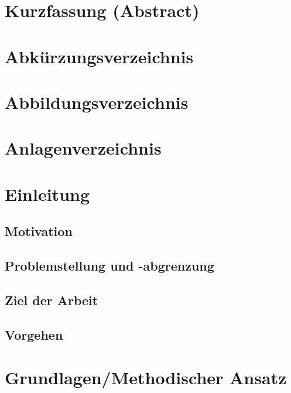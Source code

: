 \documentclass [12pt, a4paper, oneside, titlepage, ngerman]{article}
\begin{document}
\tableofcontents
\newpage


\section*{Kurzfassung (Abstract)}
\newpage

\section*{Abkürzungsverzeichnis}
\newpage

\section*{Abbildungsverzeichnis}
\newpage

\section*{Anlagenverzeichnis}
\newpage

\setcounter{page}{1}
\section{Einleitung }
\subsection {Motivation}

\subsection {Problemstellung und -abgrenzung}

\subsection {Ziel der Arbeit}

\subsection {Vorgehen}
\newpage

\section {Grundlagen/Methodischer Ansatz}
\newpage
\end{document}
